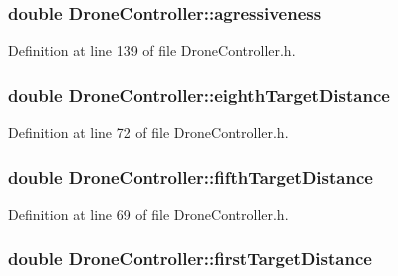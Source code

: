\subsubsection[{agressiveness}]{\setlength{\rightskip}{0pt plus 5cm}double Drone\-Controller\-::agressiveness}\label{classDroneController_a31be26954a3c64e9fe17bc18ab01edbf}


Definition at line 139 of file Drone\-Controller.\-h.

\subsubsection[{eighth\-Target\-Distance}]{\setlength{\rightskip}{0pt plus 5cm}double Drone\-Controller\-::eighth\-Target\-Distance\hspace{0.3cm}{\ttfamily [private]}}\label{classDroneController_aa5a7b90bfc650518c614e2a11714197c}


Definition at line 72 of file Drone\-Controller.\-h.

\subsubsection[{fifth\-Target\-Distance}]{\setlength{\rightskip}{0pt plus 5cm}double Drone\-Controller\-::fifth\-Target\-Distance\hspace{0.3cm}{\ttfamily [private]}}\label{classDroneController_a4bf9791cf751869c8a089ae64c72a5c7}


Definition at line 69 of file Drone\-Controller.\-h.

\subsubsection[{first\-Target\-Distance}]{\setlength{\rightskip}{0pt plus 5cm}double Drone\-Controller\-::first\-Target\-Distance\hspace{0.3cm}{\ttfamily [private]}}\label{classDroneController_a73aad5172180234c92d5e2d19d4e89ae}


